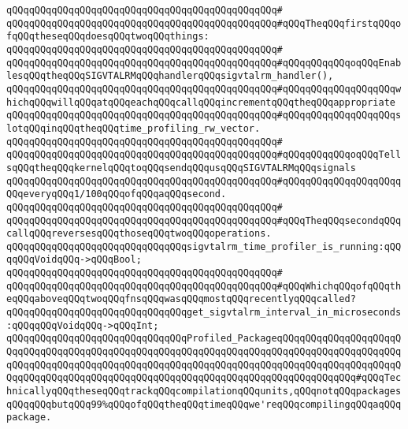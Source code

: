 \verb|qQQqqQQqqQQqqQQqqQQqqQQqqQQqqQQqqQQqqQQqqQQqqQQq#|\newline
\verb|qQQqqQQqqQQqqQQqqQQqqQQqqQQqqQQqqQQqqQQqqQQqqQQq#qQQqTheqQQqfirstqQQqofqQQqtheseqQQqdoesqQQqtwoqQQqthings:|\newline
\verb|qQQqqQQqqQQqqQQqqQQqqQQqqQQqqQQqqQQqqQQqqQQqqQQq#|\newline
\verb|qQQqqQQqqQQqqQQqqQQqqQQqqQQqqQQqqQQqqQQqqQQqqQQq#qQQqqQQqqQQqoqQQqEnablesqQQqtheqQQqSIGVTALRMqQQqhandlerqQQqsigvtalrm_handler(),|\newline
\verb|qQQqqQQqqQQqqQQqqQQqqQQqqQQqqQQqqQQqqQQqqQQqqQQq#qQQqqQQqqQQqqQQqqQQqwhichqQQqwillqQQqatqQQqeachqQQqcallqQQqincrementqQQqtheqQQqappropriate|\newline
\verb|qQQqqQQqqQQqqQQqqQQqqQQqqQQqqQQqqQQqqQQqqQQqqQQq#qQQqqQQqqQQqqQQqqQQqslotqQQqinqQQqtheqQQqtime_profiling_rw_vector.|\newline
\verb|qQQqqQQqqQQqqQQqqQQqqQQqqQQqqQQqqQQqqQQqqQQqqQQq#|\newline
\verb|qQQqqQQqqQQqqQQqqQQqqQQqqQQqqQQqqQQqqQQqqQQqqQQq#qQQqqQQqqQQqoqQQqTellsqQQqtheqQQqkernelqQQqtoqQQqsendqQQqusqQQqSIGVTALRMqQQqsignals|\newline
\verb|qQQqqQQqqQQqqQQqqQQqqQQqqQQqqQQqqQQqqQQqqQQqqQQq#qQQqqQQqqQQqqQQqqQQqqQQqeveryqQQq1/100qQQqofqQQqaqQQqsecond.|\newline
\verb|qQQqqQQqqQQqqQQqqQQqqQQqqQQqqQQqqQQqqQQqqQQqqQQq#|\newline
\verb|qQQqqQQqqQQqqQQqqQQqqQQqqQQqqQQqqQQqqQQqqQQqqQQq#qQQqTheqQQqsecondqQQqcallqQQqreversesqQQqthoseqQQqtwoqQQqoperations.|\newline
\newline
\verb|qQQqqQQqqQQqqQQqqQQqqQQqqQQqqQQqsigvtalrm_time_profiler_is_running:qQQqqQQqVoidqQQq->qQQqBool;|\newline
\verb|qQQqqQQqqQQqqQQqqQQqqQQqqQQqqQQqqQQqqQQqqQQqqQQq#|\newline
\verb|qQQqqQQqqQQqqQQqqQQqqQQqqQQqqQQqqQQqqQQqqQQqqQQq#qQQqWhichqQQqofqQQqtheqQQqaboveqQQqtwoqQQqfnsqQQqwasqQQqmostqQQqrecentlyqQQqcalled?|\newline
\newline
\verb|qQQqqQQqqQQqqQQqqQQqqQQqqQQqqQQqget_sigvtalrm_interval_in_microseconds:qQQqqQQqVoidqQQq->qQQqInt;|\newline
\newline
\verb|qQQqqQQqqQQqqQQqqQQqqQQqqQQqqQQqProfiled_PackageqQQqqQQqqQQqqQQqqQQqqQQqqQQqqQQqqQQqqQQqqQQqqQQqqQQqqQQqqQQqqQQqqQQqqQQqqQQqqQQqqQQqqQQqqQQqqQQqqQQqqQQqqQQqqQQqqQQqqQQqqQQqqQQqqQQqqQQqqQQqqQQqqQQqqQQqqQQqqQQqqQQqqQQqqQQqqQQqqQQqqQQqqQQqqQQqqQQqqQQqqQQqqQQqqQQqqQQqqQQqqQQq#qQQqTechnicallyqQQqtheseqQQqtrackqQQqcompilationqQQqunits,qQQqnotqQQqpackagesqQQqqQQqbutqQQq99%qQQqofqQQqtheqQQqtimeqQQqwe'reqQQqcompilingqQQqaqQQqpackage.|\newline
